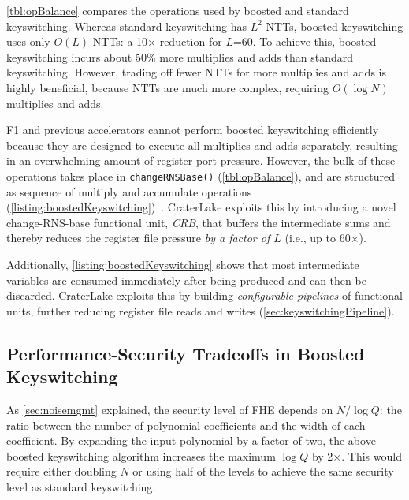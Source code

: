 \tblOpBalance

\autoref{tbl:opBalance} compares the operations used by boosted and standard
keyswitching. Whereas standard keyswitching has $L^2$ NTTs, boosted
keyswitching uses only $O(L)$ NTTs: a 10$\times$ reduction for $L$=60. To
achieve this, boosted keyswitching incurs about 50\% more multiplies and adds
than standard keyswitching. However, trading off fewer NTTs for more multiplies
and adds is highly beneficial, because NTTs are much more complex, requiring
$O(\log N)$ multiplies and adds.

F1 and previous accelerators cannot perform boosted keyswitching efficiently
because they are designed to execute all multiplies and adds separately,
resulting in an overwhelming amount of register port pressure. However, the
bulk of these operations takes place in \verb!changeRNSBase()!
(\autoref{tbl:opBalance}), and are structured as sequence of multiply and
accumulate operations
(\autoref{listing:boostedKeyswitching})~\cite{bajard:2016:full}. CraterLake
exploits this by introducing a novel change-RNS-base functional unit,
\emph{CRB}, that buffers the intermediate sums and thereby reduces the register
file pressure \emph{by a factor of $L$} (i.e., up to 60$\times$).

Additionally, \autoref{listing:boostedKeyswitching} shows that most
intermediate variables are consumed immediately after being produced and can
then be discarded. CraterLake exploits this by building \emph{configurable
pipelines} of functional units, further reducing register file reads and writes
(\autoref{sec:keyswitchingPipeline}).

\subsection{Performance-Security Tradeoffs in Boosted Keyswitching}
\label{sec:boostedSecurity}

As \autoref{sec:noisemgmt} explained, the security level of FHE depends on
$N/\log Q$: the ratio between the number of polynomial coefficients and the width
of each coefficient. By expanding the input polynomial by a factor of two, the
above boosted keyswitching algorithm increases the maximum $\log Q$ by 2$\times$.
This would require either doubling $N$ or using half of the levels to achieve
the same security level as standard keyswitching.

